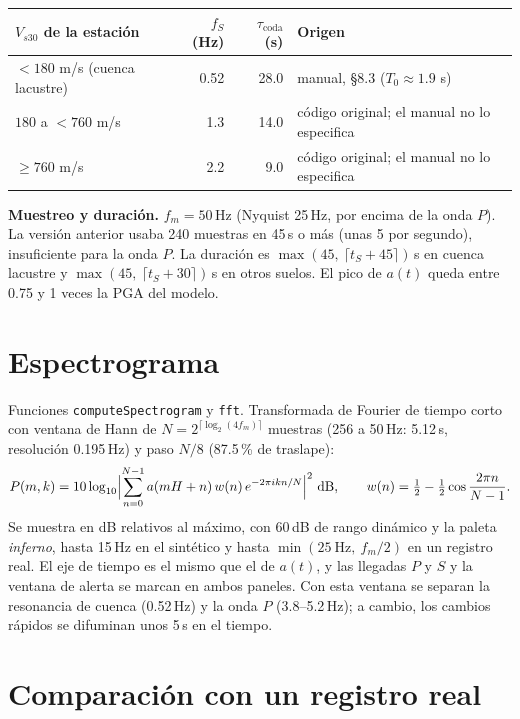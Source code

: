 \documentclass[11pt,a4paper]{article}
\begin{document}
\begin{table}[h]
\centering
\begin{tabular}{lrrl}
\toprule
$V_{s30}$ de la estación & $f_S$ (Hz) & $\tau_{\mathrm{coda}}$ (s) & Origen \\
\midrule
$< 180$ m/s (cuenca lacustre) & 0.52 & 28.0 & manual, \S8.3 ($T_0 \approx 1.9$ s) \\
$180$ a $< 760$ m/s & 1.3 & 14.0 & código original; el manual no lo especifica \\
$\ge 760$ m/s & 2.2 & 9.0 & código original; el manual no lo especifica \\
\bottomrule
\end{tabular}
\end{table}

\textbf{Muestreo y duración.} $f_m = 50$\,Hz (Nyquist 25\,Hz, por encima de la onda $P$). La versión
anterior usaba 240 muestras en 45\,s o más (unas 5 por segundo), insuficiente para la onda $P$. La
duración es $\max(45,\ \lceil t_S + 45\rceil)$\,s en cuenca lacustre y $\max(45,\ \lceil t_S + 30\rceil)$\,s
en otros suelos. El pico de $a(t)$ queda entre 0.75 y 1 veces la PGA del modelo.

\section{Espectrograma}

Funciones \texttt{computeSpectrogram} y \texttt{fft}. Transformada de Fourier de tiempo corto con
ventana de Hann de $N = 2^{\lceil \log_2(4 f_m)\rceil}$ muestras (256 a 50\,Hz: 5.12\,s, resolución
0.195\,Hz) y paso $N/8$ (87.5\,\% de traslape):
\begin{equation}
  P(m, k) = 10\log_{10}\Bigl|\sum_{n=0}^{N-1} a(mH + n)\,w(n)\,e^{-2\pi i k n/N}\Bigr|^2 \ \text{dB},
  \qquad w(n) = \tfrac12 - \tfrac12\cos\frac{2\pi n}{N-1}.
\end{equation}
Se muestra en dB relativos al máximo, con 60\,dB de rango dinámico y la paleta \emph{inferno}, hasta
15\,Hz en el sintético y hasta $\min(25\ \text{Hz},\ f_m/2)$ en un registro real. El eje de tiempo es
el mismo que el de $a(t)$, y las llegadas $P$ y $S$ y la ventana de alerta se marcan en ambos paneles.
Con esta ventana se separan la resonancia de cuenca (0.52\,Hz) y la onda $P$ (3.8--5.2\,Hz); a cambio,
los cambios rápidos se difuminan unos 5\,s en el tiempo.

\section{Comparación con un registro real}
\end{document}

